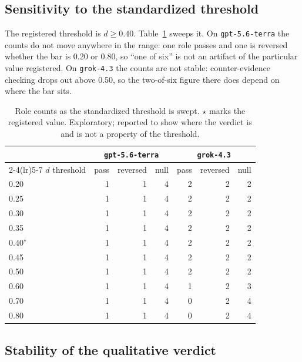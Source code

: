 \subsection{Sensitivity to the standardized threshold}

The registered threshold is $d \ge 0.40$. Table~\ref{tab:threshold-sweep} sweeps it. On
\texttt{gpt-5.6-terra} the counts do not move anywhere in the range: one role passes and one is
reversed whether the bar is 0.20 or 0.80, so ``one of six'' is not an artifact of the particular
value registered. On \texttt{grok-4.3} the counts are not stable: counter-evidence checking drops out
above 0.50, so the two-of-six figure there does depend on where the bar sits.

\begin{table}[h]
\centering
\small
\begin{tabular}{lrrrrrr}
\toprule
 & \multicolumn{3}{c}{\texttt{gpt-5.6-terra}} & \multicolumn{3}{c}{\texttt{grok-4.3}} \\
\cmidrule(lr){2-4}\cmidrule(lr){5-7}
$d$ threshold & pass & reversed & null & pass & reversed & null \\
\midrule
0.20          & 1 & 1 & 4 & 2 & 2 & 2 \\
0.25          & 1 & 1 & 4 & 2 & 2 & 2 \\
0.30          & 1 & 1 & 4 & 2 & 2 & 2 \\
0.35          & 1 & 1 & 4 & 2 & 2 & 2 \\
$0.40^\star$  & 1 & 1 & 4 & 2 & 2 & 2 \\
0.45          & 1 & 1 & 4 & 2 & 2 & 2 \\
0.50          & 1 & 1 & 4 & 2 & 2 & 2 \\
0.60          & 1 & 1 & 4 & 1 & 2 & 3 \\
0.70          & 1 & 1 & 4 & 0 & 2 & 4 \\
0.80          & 1 & 1 & 4 & 0 & 2 & 4 \\
\bottomrule
\end{tabular}
\caption{Role counts as the standardized threshold is swept. $\star$ marks the registered value.
Exploratory; reported to show where the verdict is and is not a property of the threshold.}
\label{tab:threshold-sweep}
\end{table}

\subsection{Stability of the qualitative verdict}

